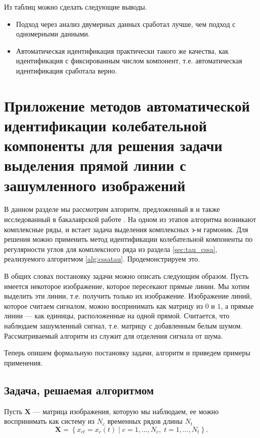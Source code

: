 \documentclass[specialist,
               substylefile = spbu.rtx,
               subf,href,colorlinks=true, 12pt]{disser}
\begin{document}
{{Из таблиц можно сделать следующие выводы.
\begin{itemize}
\item Подход через анализ двумерных данных сработал лучше, чем подход с одномерными данными.
\item Автоматическая идентификация практически такого же качества, как идентификация с фиксированным числом компонент, т.е. автоматическая идентификация сработала верно.  
\end{itemize}

\section{Приложение методов автоматической идентификации колебательной компоненты для решения задачи выделения прямой линии с зашумленного изображений}
\label{sec:use_cssa}

В данном разделе мы рассмотрим алгоритм, предложенный в \cite{Trickett2003} и также исследованный в бакалаврской работе \cite{Zhornikova2016}. 
На одном из этапов алгоритма возникают комплексные ряды, и встает задача выделения комплексных э-м гармоник. 
Для решения можно применить метод идентификации колебательной компоненты по регулярности углов для комплексного ряда из раздела \ref{sec:tau_cssa}, реализуемого алгоритмом \ref{alg:cssatau}. Продемонстрируем это.

В общих словах постановку задачи можно описать следующим образом. Пусть имеется некоторое изображение, которое пересекают прямые линии. Мы хотим выделить эти линии, т.е. получить только их изображение.
Изображение линий, которое считаем сигналом, можно воспринимать как матрицу из $0$ и $1$, а прямые линии --- как единицы, расположенные на одной прямой. Считается, что наблюдаем зашумленный сигнал, т.е. матрицу с добавленным белым шумом. 
Рассматриваемый алгоритм из \cite{Trickett2003} служит для отделения сигнала от шума. 

Теперь опишем формальную постановку задачи, алгоритм и приведем примеры применения.  

\subsection{Задача, решаемая алгоритмом} \label{sec:chapter3_task}
Пусть $\mathbf{X}$ --- матрица изображения, которую мы наблюдаем, ее можно воспринимать как систему из $N_c$ временных рядов длины $N_t$
\begin{equation*}
	\mathbf{X}=\left\{x_{ct}=x_c(t) \; | \; c=1, \ldots, N_c, \; t=1, \ldots, N_t\right\}.
\end{equation*}

}}
\end{document}
